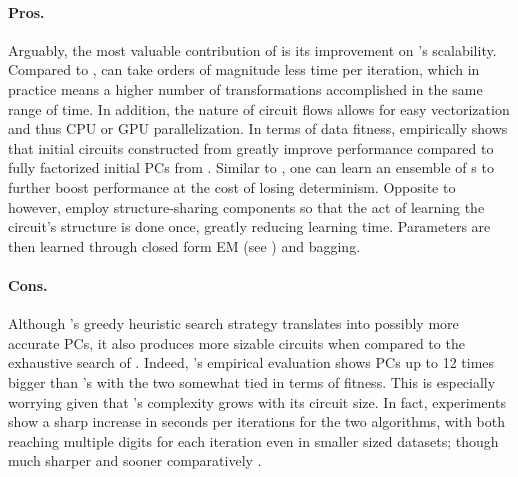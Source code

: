 \paragraph{Pros.} Arguably, the most valuable contribution of  is its improvement
on 's scalability. Compared to ,  can
take orders of magnitude less time per iteration, which in practice means a higher number of
transformations accomplished in the same range of time. In addition, the nature of circuit flows
allows for easy vectorization and thus CPU or GPU parallelization. In terms of data fitness,
\citet{dang20} empirically shows that initial circuits constructed from 
greatly improve performance compared to fully factorized initial PCs from .
Similar to , one can learn an ensemble of s to further boost
performance at the cost of losing determinism. Opposite to  however,
\citeauthor{dang20} employ structure-sharing components so that the act of learning the circuit's
structure is done once, greatly reducing learning time. Parameters are then learned through closed
form EM (see ) and bagging.

\paragraph{Cons.} Although 's greedy heuristic search strategy translates into
possibly more accurate PCs, it also produces more sizable circuits when compared to the exhaustive
search of . Indeed, \citet{dang20}'s empirical evaluation shows
 PCs up to 12 times bigger than 's with the two somewhat tied
in terms of fitness. This is especially worrying given that 's complexity grows
with its circuit size. In fact, experiments show a sharp increase in seconds per iterations for the
two \incrclass{} algorithms, with both reaching multiple digits for each iteration even in smaller
sized datasets; though  much sharper and sooner comparatively \citep{dang20}.

